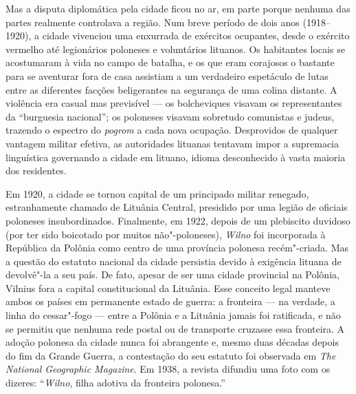 Mas a disputa diplomática pela cidade ficou no ar, em parte porque
nenhuma das partes realmente controlava a região. Num breve período de
dois anos (1918--1920), a cidade vivenciou uma enxurrada de exércitos
ocupantes, desde o exército vermelho até legionários poloneses e
voluntários lituanos. Os habitantes locais se acostumaram à vida no
campo de batalha, e os que eram corajosos o bastante para se aventurar
fora de casa assistiam a um verdadeiro espetáculo de lutas entre as
diferentes facções beligerantes na segurança de uma colina distante. A
violência era casual mas previsível --- os bolcheviques visavam os
representantes da ``burguesia nacional''; os poloneses visavam sobretudo
comunistas e judeus, trazendo o espectro do \textit{pogrom} a cada nova ocupação.
Desprovidos de qualquer vantagem militar efetiva, as autoridades
lituanas tentavam impor a supremacia linguística governando a cidade em
lituano, idioma desconhecido à vasta maioria dos residentes.

Em 1920, a cidade se tornou capital de um principado militar renegado,
estranhamente chamado de Lituânia Central, presidido por uma legião de
oficiais poloneses insubordinados. Finalmente, em 1922, depois de um
plebiscito duvidoso (por ter sido boicotado por muitos não"-poloneses),
\textit{Wilno} foi incorporada à República da Polônia como centro de uma
província polonesa recém"-criada. Mas a questão do estatuto nacional da
cidade persistia devido à exigência lituana de devolvê"-la a seu país. De
fato, apesar de ser uma cidade provincial na Polônia, Vilnius fora a
capital constitucional da Lituânia. Esse conceito legal manteve ambos os
países em permanente estado de guerra: a fronteira --- na verdade, a linha
do cessar"-fogo --- entre a Polônia e a Lituânia jamais foi ratificada, e
não se permitiu que nenhuma rede postal ou de transporte cruzasse essa
fronteira. A adoção polonesa da cidade nunca foi abrangente e, mesmo
duas décadas depois do fim da Grande Guerra, a contestação do seu
estatuto foi observada em \textit{The National Geographic Magazine}. Em
1938, a revista difundiu uma foto com os dizeres: ``\textit{Wilno}, filha adotiva
da fronteira polonesa.''

%

\asterisc

